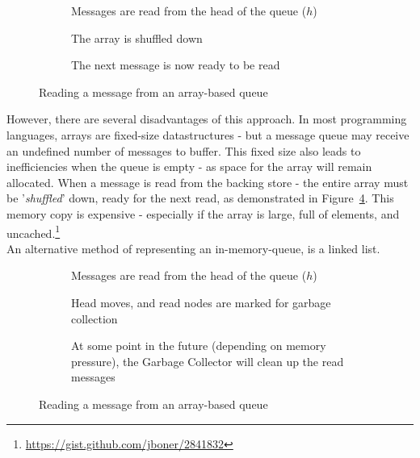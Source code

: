 \begin{figure}[ht]
  \centering
  \begin{subfigure}[b]{\textwidth}
    \centering
    
    \caption{Messages are read from the head of the queue ($h$)}
    \label{fig:tikz:queueArrayInitial}
  \end{subfigure}

  \begin{subfigure}[b]{\textwidth}
    \centering
    
    \caption{The array is shuffled down}
    \label{fig:tikz:queueArrayHeadRead}
  \end{subfigure}

  \begin{subfigure}[b]{\textwidth}
    \centering
    
    \caption{The next message is now ready to be read}
    \label{fig:tikz:queueArrayPostShuffle}
  \end{subfigure}
  \caption{Reading a message from an array-based queue}
  \label{fig:tikz:queueArray}
\end{figure}

However, there are several disadvantages of this approach. In most programming
languages, arrays are fixed-size datastructures - but a message queue may
receive an undefined number  of messages to buffer. This fixed size also leads
to inefficiencies when the queue is empty - as space for the array will remain
allocated. When a message is read from the backing store - the entire array must
be '\textit{shuffled}' down, ready for the next read, as demonstrated in
Figure~\ref{fig:tikz:queueArray}. This memory copy is expensive - especially if
the array is large, full of elements, and
uncached.\footnote{\url{https://gist.github.com/jboner/2841832}}\\

An alternative method of representing an in-memory-queue, is a linked list.

\begin{figure}[ht]
  \centering
  \begin{subfigure}[b]{\textwidth}
    \centering
    
    \caption{Messages are read from the head of the queue ($h$)}
    \label{fig:tikz:queueLinkedList}
  \end{subfigure}

  \begin{subfigure}[b]{\textwidth}
    \centering
    
    \caption{Head moves, and read nodes are marked for garbage collection}
    \label{fig:tikz:queueLinkedListHeadRead}
  \end{subfigure}

  \begin{subfigure}[b]{\textwidth}
    \centering
    
    \caption{At some point in the future (depending on memory pressure),
             the Garbage Collector will clean up the read messages}
    \label{fig:tikz:queueLinkedListGCRun}
  \end{subfigure}
  \caption{Reading a message from an array-based queue}
  \label{fig:tikz:queueLinkedListGCRun}
\end{figure}

